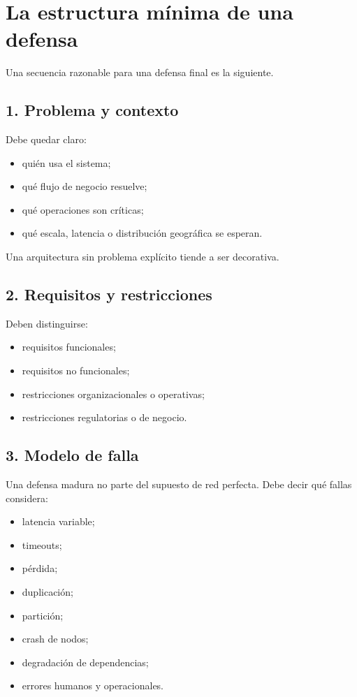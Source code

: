 \documentclass[variant=apuntes,cover=institutional,mode=screen]{ua-engineering-v6-article}
\begin{document}
\section{La estructura mínima de una defensa}

Una secuencia razonable para una defensa final es la siguiente.

\subsection{1. Problema y contexto}

Debe quedar claro:
\begin{itemize}
\item quién usa el sistema;
\item qué flujo de negocio resuelve;
\item qué operaciones son críticas;
\item qué escala, latencia o distribución geográfica se esperan.
\end{itemize}

Una arquitectura sin problema explícito tiende a ser decorativa.

\subsection{2. Requisitos y restricciones}

Deben distinguirse:
\begin{itemize}
\item requisitos funcionales;
\item requisitos no funcionales;
\item restricciones organizacionales o operativas;
\item restricciones regulatorias o de negocio.
\end{itemize}

\subsection{3. Modelo de falla}

Una defensa madura no parte del supuesto de red perfecta. Debe decir qué fallas considera:

\begin{itemize}
\item latencia variable;
\item timeouts;
\item pérdida;
\item duplicación;
\item partición;
\item crash de nodos;
\item degradación de dependencias;
\item errores humanos y operacionales.
\end{itemize}
\end{document}
